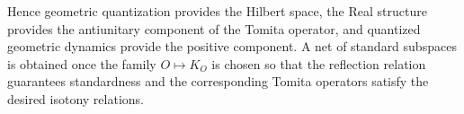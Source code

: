 \documentclass[a4paper,11pt]{article}
\theoremstyle{definition}
\newcommand{\nn}{\nonumber}
\newcommand{\NL}[1]{\textcolor{blue}{#1}}
\begin{document}
Hence geometric quantization provides the Hilbert space, the Real structure
provides the antiunitary component of the Tomita operator, and quantized
geometric dynamics provide the positive component.  A net of standard
subspaces is obtained once the family $O\mapsto K_O$ is chosen so that the
reflection relation guarantees standardness and the corresponding Tomita
operators satisfy the desired isotony relations.




\end{document}
